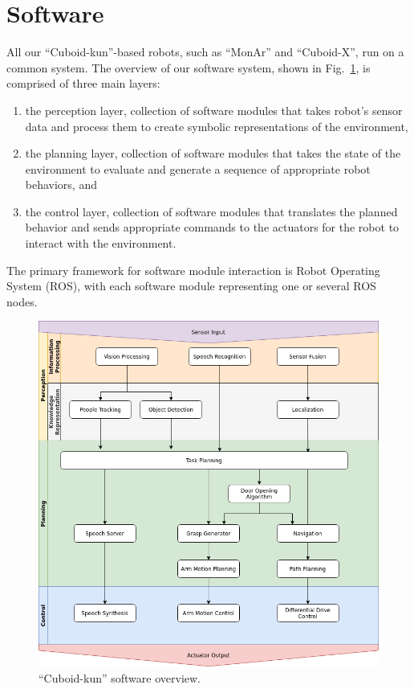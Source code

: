 \documentclass[runningheads,a4paper]{llncs}
\begin{document}
\section{Software}
All our ``Cuboid-kun''-based robots, such as ``MonAr'' and ``Cuboid-X'', run on a common system.
The overview of our software system, shown in Fig.~\ref{fig:software}, is comprised of three main layers:
\begin{enumerate}
    \item the perception layer, collection of software modules that takes robot’s sensor data and process them to create symbolic representations of the environment,
    \item the planning layer, collection of software modules that takes the state of the environment to evaluate and generate a sequence of appropriate robot behaviors, and
    \item the control layer, collection of software modules that translates the planned behavior and sends appropriate commands to the actuators for the robot to interact with the environment.
\end{enumerate}
The primary framework for software module interaction is Robot Operating System (ROS), with each software module representing one or several ROS nodes.
\begin{figure}[tbp]
    \centering
    \includegraphics[width=0.6\linewidth]{images/SoftwareOverview.png}
    \caption{``Cuboid-kun'' software overview.}
    \label{fig:software}
\end{figure}
\end{document}
